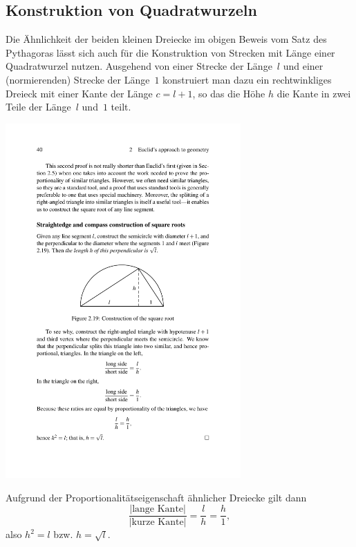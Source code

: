 \subsection*{Konstruktion von Quadratwurzeln}

Die Ähnlichkeit der beiden kleinen Dreiecke im obigen Beweis vom Satz des Pythagoras
lässt sich auch für die Konstruktion von Strecken mit Länge einer Quadratwurzel nutzen.
Ausgehend von einer Strecke der Länge~$l$ und einer (normierenden)
Strecke der Länge~$1$ konstruiert man dazu ein rechtwinkliges Dreieck
mit einer Kante der Länge $c=l+1$, so das die Höhe $h$ die Kante in
zwei Teile der Länge~$l$ und~$1$ teilt.

\centerline{\includegraphics[width=9cm]{BILDER/BildKonstruktionEinerWurzel.pdf}}

Aufgrund der Proportionalitätseigenschaft
ähnlicher Dreiecke gilt dann
$$
\frac{|\mbox{lange Kante}|}{|\mbox{kurze Kante}|}=\frac{l}{h}=\frac{h}{1},
$$
also $h^2=l$ bzw. $h=\sqrt{l}$.



